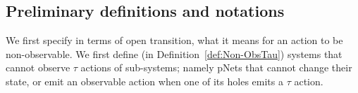 \documentclass{elsarticle}
\newcommand{\TODO}[1]{\textcolor{red}{\textbf{[TODO:#1]}}}
\begin{document}


\subsection{Preliminary definitions and notations}


We first specify in terms of open transition, what it means for an action to be non-observable. We first define (in Definition~\ref{def:Non-ObsTau}) systems that cannot observe $\tau$ actions of sub-systems; namely pNets that cannot change their state, or emit an observable action when one of its holes emits a $\tau$ action.
\end{document}
